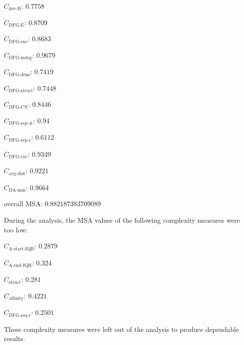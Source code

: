 \documentclass[a4paper]{article}
\newcommand{\startiqrname}{\text{A-start-IQR}}
\newcommand{\startiqr}{C_{\startiqrname}}
\newcommand{\lastiqrname}{\text{A-end-IQR}}
\newcommand{\lastiqr}{C_{\lastiqrname}}
\newcommand{\daminname}{\text{DA-min}}
\newcommand{\damin}{C_{\daminname}}
\newcommand{\dfgedgesname}{\text{DFG-E}}
\newcommand{\dfgedges}{C_{\dfgedgesname}}
\newcommand{\dfgcncname}{\text{DFG-cnc}}
\newcommand{\dfgcnc}{C_{\dfgcncname}}
\newcommand{\dfgmaxdegname}{\text{DFG-mdeg}}
\newcommand{\dfgmaxdeg}{C_{\dfgmaxdegname}}
\newcommand{\dfgdensname}{\text{DFG-dens}}
\newcommand{\dfgdens}{C_{\dfgdensname}}
\newcommand{\dfgstructname}{\text{DFG-struct}}
\newcommand{\dfgstruct}{C_{\dfgstructname}}
\newcommand{\dfgcycnumbername}{\text{DFG-CN}}
\newcommand{\dfgcycnumber}{C_{\dfgcycnumbername}}
\newcommand{\dfgsepnumname}{\text{DFG-sep-\#}}
\newcommand{\dfgsepnum}{C_{\dfgsepnumname}}
\newcommand{\dfgseprationame}{\text{DFG-sep-r}}
\newcommand{\dfgsepratio}{C_{\dfgseprationame}}
\newcommand{\dfgseqrationame}{\text{DFG-seq-r}}
\newcommand{\dfgseqratio}{C_{\dfgseqrationame}}
\newcommand{\dfgcycname}{\text{DFG-cyc}}
\newcommand{\dfgcyc}{C_{\dfgcycname}}
\newcommand{\structurename}{\text{struct}}
\newcommand{\structure}{C_{\structurename}}
\newcommand{\affinityname}{\text{affinity}}
\newcommand{\affinity}{C_{\affinityname}}
\newcommand{\deviationfromrandomname}{\text{dev-R}}
\newcommand{\deviationfromrandom}{C_{\deviationfromrandomname}}
\newcommand{\avgdistname}{\text{avg-dist}}
\newcommand{\avgdist}{C_{\avgdistname}}
\begin{document}
\begin{compactitem}
\item $\deviationfromrandom$: $0.7758$
\item $\dfgedges$: $0.8709$
\item $\dfgcnc$: $0.8683$
\item $\dfgmaxdeg$: $0.9679$
\item $\dfgdens$: $0.7419$
\item $\dfgstruct$: $0.7448$
\item $\dfgcycnumber$: $0.8446$
\item $\dfgsepnum$: $0.94$
\item $\dfgsepratio$: $0.6112$
\item $\dfgcyc$: $0.9349$
\item $\avgdist$: $0.9221$
\item $\damin$: $0.9664$
\item overall MSA: $0.882187383709089$
\end{compactitem}

\bigskip
\noindent
During the analysis, the MSA values of the following complexity measures were too low:
\begin{compactitem}
\item $\startiqr$: $0.2879$
\item $\lastiqr$: $0.324$
\item $\structure$: $0.281$
\item $\affinity$: $0.4221$
\item $\dfgseqratio$: $0.2501$
\end{compactitem}
These complexity measures were left out of the analysis to produce dependable results.
\end{document}

